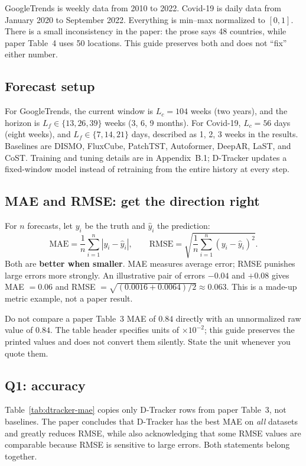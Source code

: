 GoogleTrends is weekly data from 2010 to 2022. Covid-19 is daily data from January 2020 to September
2022. Everything is min--max normalized to $[0,1]$. There is a small inconsistency in the paper: the
prose says 48 countries, while paper Table~4 uses 50 locations. This guide preserves both and does not
``fix'' either number.

\subsection{Forecast setup}

For GoogleTrends, the current window is $L_c=104$ weeks (two years), and the horizon is
$L_f\in\{13,26,39\}$ weeks (3, 6, 9 months). For Covid-19, $L_c=56$ days (eight weeks), and
$L_f\in\{7,14,21\}$ days, described as 1, 2, 3 weeks in the results. Baselines are DISMO, FluxCube,
PatchTST, Autoformer, DeepAR, LaST, and CoST. Training and tuning details are in Appendix~B.1; D-Tracker
updates a fixed-window model instead of retraining from the entire history at every step.

\subsection{MAE and RMSE: get the direction right}

For $n$ forecasts, let $y_i$ be the truth and $\hat y_i$ the prediction:
\[
  \mathrm{MAE}=\frac1n\sum_{i=1}^n|y_i-\hat y_i|,
  \qquad
  \mathrm{RMSE}=\sqrt{\frac1n\sum_{i=1}^n(y_i-\hat y_i)^2}.
\]
Both are \textbf{better when smaller}. MAE measures average error; RMSE punishes large errors more
strongly. An illustrative pair of errors $-0.04$ and $+0.08$ gives MAE $=0.06$ and
RMSE $=\sqrt{(0.0016+0.0064)/2}\approx0.063$. This is a made-up metric example, not a paper result.

\begin{commonmistake}
Do not compare a paper Table~3 MAE of $0.84$ directly with an unnormalized raw value of $0.84$. The table
header specifies units of $\times10^{-2}$; this guide preserves the printed values and does not convert
them silently. State the unit whenever you quote them.
\end{commonmistake}

\subsection{Q1: accuracy}

Table~\ref{tab:dtracker-mae} copies only D-Tracker rows from paper Table~3, not baselines. The paper
concludes that D-Tracker has the best MAE on \emph{all} datasets and greatly reduces RMSE, while also
acknowledging that some RMSE values are comparable because RMSE is sensitive to large errors. Both
statements belong together.


